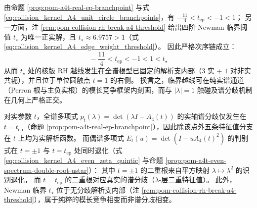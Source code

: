 \begin{remark}\label{rem:pom-a4t-newman-unit-circle-separation}
由命题 \ref{prop:pom-a4t-real-ep-branchpoint} 与式 \eqref{eq:collision_kernel_A4_unit_circle_branchpoints}，有
\(
-\frac{11}{4}<t_{\mathrm{ep}}<-1<1
\)；
另一方面，注 \ref{rem:pom-collision-rh-break-a4-threshold} 给出四阶 Newman 临界阈值 \(t_\star\) 为唯一正实解，且 \(t_\star\approx 6.9757>1\)（式 \eqref{eq:collision_kernel_A4_edge_weight_threshold}）。
因此严格次序链成立：
\[
\boxed{\;-\frac{11}{4}<t_{\mathrm{ep}}<-1<1<t_\star\;}
\]
从而 \(t_\star\) 处的核版 RH 越线发生在全谱根型已固定的解析支内部（\(3\) 实 \(+\) \(1\) 对非实共轭），并且位于单位圆触点 \(t=1\) 的右侧。
换言之，临界越线可在纯实谱通道（Perron 根与主负实根）的模长竞争框架内刻画，而与 \(|\lambda|=1\) 触碰及谱分歧机制在几何上严格正交。
\end{remark}

\begin{conclusion}\label{con:pom-a4t-branching-layered-structure}
对实参数 \(t\)，全谱多项式 \(p_t(\lambda)=\det(\lambda I-A_4(t))\) 的实轴谱分歧仅发生在 \(t=t_{\mathrm{ep}}\)（命题 \ref{prop:pom-a4t-real-ep-branchpoint}），因此除该点外五条特征值分支在 \(t\) 上均为实解析函数。
而偶谱多项式 \(E_t(u)=\det(I-uA_4(t)^2)\) 的判别式在 \(t=\pm1\) 与 \(t=t_{\mathrm{ep}}\) 处同时退化（式 \eqref{eq:collision_kernel_A4_even_zeta_quintic} 与命题 \ref{prop:pom-a4t-even-spectrum-double-root-ustar}）：
其中 \(t=\pm1\) 的二重根来自平方映射 \(\lambda\mapsto \lambda^2\) 的识别退化，
而 \(t=t_{\mathrm{ep}}\) 的二重根对应真实的谱分歧（\(\lambda\)-层二重特征值）。
此外，Newman 临界 \(t_\star\) 位于无分歧解析支内部（注 \ref{rem:pom-collision-rh-break-a4-threshold}），属于纯粹的模长竞争相变而非谱分歧相变。
\end{conclusion}
